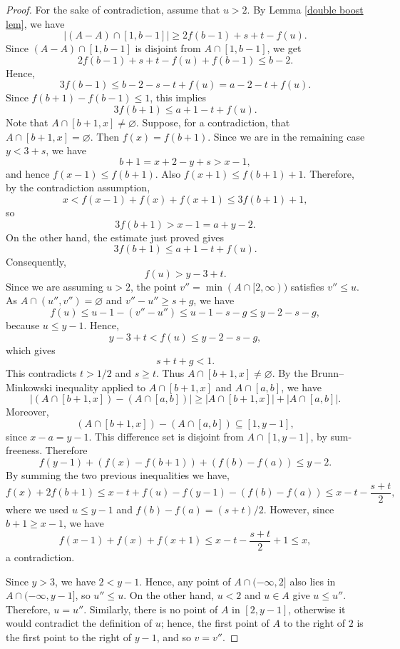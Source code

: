 \documentclass[11pt,reqno]{amsart}
\theoremstyle{definition}
\def\F#1{f(#1)}
\begin{document}
\begin{proof}
    For the sake of contradiction, assume that $u>2$. By Lemma \ref{double boost lem}, we have
    $$
        |(A - A)\cap [1, b - 1]|
        \geq 2\F{b - 1} + s + t - \F{u}.
    $$
    Since $(A-A)\cap[1,b-1]$ is disjoint from $A\cap[1,b-1]$, we get
    $$
        2\F{b - 1} + s + t - \F{u} + \F{b-1}\leq b-2.
    $$
    Hence,  
    $$
        3\F{b - 1}\leq b - 2 - s - t + \F{u} = a - 2 - t + \F{u}.
    $$
    Since $\F{b+1}-\F{b-1}\leq1$, this implies
    $$
        3\F{b + 1}\leq a + 1 - t + \F{u}.
    $$
 Note that $A\cap[b+1,x]\neq \varnothing$.
 Suppose, for a contradiction,
that $A\cap[b+1,x]=\varnothing$. Then $\F{x}=\F{b+1}$. Since we are in the
remaining case $y<3+s$, we have
$$
    b+1=x+2-y+s>x-1,
$$
and hence $\F{x-1}\leq \F{b+1}$. Also $\F{x+1}\leq \F{b+1}+1$. Therefore, by
the contradiction assumption,
$$
    x<\F{x-1}+\F{x}+\F{x+1}\leq 3\F{b+1}+1,
$$
so
$$
    3\F{b+1}>x-1=a+y-2.
$$
On the other hand, the estimate just proved gives
$$
    3\F{b+1}\leq a+1-t+\F{u}.
$$
Consequently,
$$
    \F{u}>y-3+t.
$$
Since we are assuming $u>2$, the point $v''=\min(A\cap[2,\infty))$ satisfies
$v''\leq u$. As $A\cap(u'',v'')=\varnothing$ and $v''-u''\geq s+g$, we have
$$
    \F{u}\leq u-1-(v''-u'')\leq u-1-s-g\leq y-2-s-g,
$$
because $u\leq y-1$. Hence,  
$$
    y-3+t<\F{u}\leq y-2-s-g,
$$
which gives
$$
    s+t+g<1.
$$
This contradicts $t>1/2$ and $s\geq t$. Thus $A\cap[b+1,x]\neq\varnothing$.
By the Brunn--Minkowski inequality applied to
    $A\cap[b+1,x]$ and $A\cap[a,b]$, we have
    $$
        |(A\cap[b+1,x])-(A\cap[a,b])|
        \geq
        |A\cap[b+1,x]|+|A\cap[a,b]|.
    $$
    Moreover,
    $$
        (A\cap[b+1,x])-(A\cap[a,b])
        \subseteq [1,y-1],
    $$
    since $x-a=y-1$. This difference set is disjoint from $A\cap[1,y-1]$, by sum-freeness. Therefore
    $$
        \F{y - 1} + (\F{x} - \F{b + 1}) + (\F{b} - \F{a})\leq y - 2.
    $$
     By summing the two previous inequalities we have,
    $$
        \F{x}+2\F{b+1}
        \leq x-t+\F{u}-\F{y-1}-(\F{b}-\F{a})
        \leq x-t-\frac{s+t}{2},
    $$
    where we used $u\leq y-1$ and $\F{b}-\F{a}=(s+t)/2$. However, since $b+1\geq x-1$, we have
    $$
        \F{x - 1} + \F{x} + \F{x + 1}
        \leq x - t - \frac{s + t}{2} + 1
        \leq x,
    $$
    a contradiction.

    
Since $y>3$, we have $2<y-1$. Hence,   any point of $A\cap(-\infty,2]$ also lies in $A\cap(-\infty,y-1]$, so $u''\leq u$. On the other hand, $u<2$ and $u\in A$ give $u\leq u''$. Therefore,   $u=u''$. Similarly, there is no point of $A$ in $[2,y-1]$, otherwise it would contradict the definition of $u$; hence, the first point of $A$ to the right of $2$ is the first point to the right of $y-1$, and so $v=v''$.
\end{proof}
\end{document}
